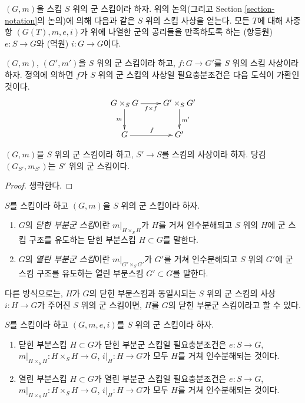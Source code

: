 \noindent
$(G, m)$을 스킴 $S$ 위의 군 스킴이라 하자.
위의 논의(그리고 Section \ref{section-notation}의 논의)에 의해 다음과 같은
$S$ 위의 스킴 사상을 얻는다. 모든 $T$에 대해 사중항
$(G(T), m, e, i)$가 위에 나열한 군의 공리들을 만족하도록 하는
(항등원) $e : S \to G$와 (역원) $i : G \to G$이다.

\medskip\noindent
$(G, m)$, $(G', m')$을 $S$ 위의 군 스킴이라 하고,
$f : G \to G'$를 $S$ 위의 스킴 사상이라 하자. 정의에 의하면 $f$가
$S$ 위의 군 스킴의 사상일 필요충분조건은 다음 도식이 가환인 것이다.
$$
\xymatrix{
G \times_S G \ar[r]_-{f \times f} \ar[d]_m &
G' \times_S G' \ar[d]^{m'} \\
G \ar[r]^f & G'
}
$$

\begin{lemma}
\label{lemma-base-change-group-scheme}
$(G, m)$을 $S$ 위의 군 스킴이라 하고, $S' \to S$를 스킴의 사상이라 하자.
당김 $(G_{S'}, m_{S'})$는 $S'$ 위의 군 스킴이다.
\end{lemma}

\begin{proof}
생략한다.
\end{proof}

\begin{definition}
\label{definition-closed-subgroup-scheme}
$S$를 스킴이라 하고 $(G, m)$을 $S$ 위의 군 스킴이라 하자.
\begin{enumerate}
\item $G$의 {\it 닫힌 부분군 스킴}이란 $m|_{H \times_S H}$가 $H$를 거쳐 인수분해되고
$S$ 위의 $H$에 군 스킴 구조를 유도하는 닫힌 부분스킴 $H \subset G$를 말한다.
\item $G$의 {\it 열린 부분군 스킴}이란 $m|_{G' \times_S G'}$가 $G'$를 거쳐 인수분해되고
$S$ 위의 $G'$에 군 스킴 구조를 유도하는 열린 부분스킴 $G' \subset G$를 말한다.
\end{enumerate}
\end{definition}

\noindent
다른 방식으로는, $H$가 $G$의 닫힌 부분스킴과 동일시되는 $S$ 위의 군 스킴의 사상
$i : H \to G$가 주어진 $S$ 위의 군 스킴이면, $H$를 $G$의 닫힌 부분군 스킴이라고 할 수 있다.

\begin{lemma}
\label{lemma-closed-subgroup-scheme}
$S$를 스킴이라 하고 $(G, m, e, i)$를 $S$ 위의 군 스킴이라 하자.
\begin{enumerate}
\item 닫힌 부분스킴 $H \subset G$가 닫힌 부분군 스킴일 필요충분조건은
$e : S \to G$, $m|_{H \times_S H} : H \times_S H \to G$, $i|_H : H \to G$가 모두
$H$를 거쳐 인수분해되는 것이다.
\item 열린 부분스킴 $H \subset G$가 열린 부분군 스킴일 필요충분조건은
$e : S \to G$, $m|_{H \times_S H} : H \times_S H \to G$, $i|_H : H \to G$가 모두
$H$를 거쳐 인수분해되는 것이다.
\end{enumerate}
\end{lemma}

